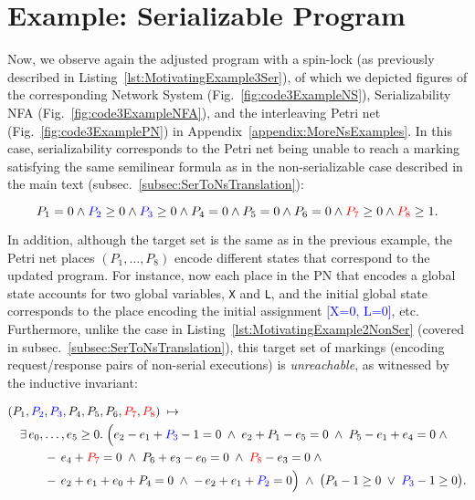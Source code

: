 
\section{Example: Serializable Program}
\label{appendix:ns-serializable}


Now, we observe again the adjusted program with a spin-lock (as previously described in Listing~\ref{lst:MotivatingExample3Ser}), of which we depicted figures of the corresponding Network System (Fig.~\ref{fig:code3ExampleNS}), Serializability NFA (Fig.~\ref{fig:code3ExampleNFA}), and the interleaving Petri net (Fig.~\ref{fig:code3ExamplePN}) in Appendix~\ref{appendix:MoreNsExamples}.
%
In this case, serializability corresponds to the Petri net being unable to reach a marking satisfying the same semilinear formula as in the non-serializable case described in the main text (subsec.~\ref{subsec:SerToNsTranslation}):

\[
P_1 = 0 \wedge 
\textcolor{blue}{P_2} \ge 0 \wedge \textcolor{blue}{P_3} \ge 0  \wedge P_4 = 0
\wedge P_5 = 0 \wedge P_6 = 0 \wedge \textcolor{red}{P_7} \ge 0 \wedge \textcolor{red}{P_8} \ge 1.
\]

%


In addition, although the target set is the same as in the previous example, the Petri net places $(P_1,\ldots,P_8)$ encode different states that correspond to the updated program. For instance, now each place in the PN that encodes a global state accounts for two global variables, \texttt{X} and \texttt{L}, and the initial global state corresponds to the place encoding the initial assignment \textcolor{blue}{[X=0, L=0]}, etc.
%
Furthermore, unlike the case in Listing~\ref{lst:MotivatingExample2NonSer} (covered in subsec.~\ref{subsec:SerToNsTranslation}), this target set of markings (encoding request/response pairs of non-serial executions) is \textit{unreachable}, as witnessed by the inductive invariant:


\[
\begin{aligned}
	&(P_{1},\textcolor{blue}{P_{2}},\textcolor{blue}{P_{3}},P_{4},P_{5},P_{6},\textcolor{red}{P_{7}},\textcolor{red}{P_{8}})
	\;\mapsto\;\\
	&\quad
	\exists\,e_{0},\dots,e_{5}\ge0.\;
	\Bigl(
	e_{2}-e_{1}+\textcolor{blue}{P_{3}}-1=0\;\land\;
	e_{2}+P_{1}-e_{5}=0\;\land\;
	P_{5}-e_{1}+e_{4}=0\;\land\\
	&\qquad\quad
	-\,e_{4}+\textcolor{red}{P_{7}}=0\;\land\;
	P_{6}+e_{3}-e_{0}=0\;\land\;
	\textcolor{red}{P_{8}}-e_{3}=0\;\land\\
	&\qquad\quad
	-\,e_{2}+e_{1}+e_{0}+P_{4}=0\;\land\;
	-\,e_{2}+e_{1}+\textcolor{blue}{P_{2}}=0
	\Bigr)
	\;\land\;
	\bigl(P_{4}-1\ge0\;\lor\;\textcolor{blue}{P_{3}}-1\ge0\bigr).
\end{aligned}
\]


